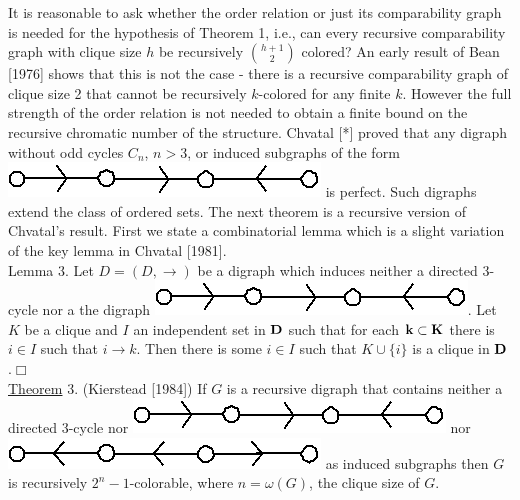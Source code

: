 \documentclass[twoside]{article}
\begin{document}
It is reasonable to ask whether the order relation or just its comparability graph is needed for the hypothesis of
Theorem 1, i.e., can every recursive comparability graph with clique size $h$ be recursively $\binom{h+1}{2}$ colored?   An early result of Bean [1976] shows that
this is not the case - there is a recursive comparability graph of clique size
2	that cannot be recursively   $k$-colored for any finite $k$.    However the full strength of the order relation is not needed to obtain a finite bound on the recursive chromatic number of the structure.    
Chvatal [*] proved that any digraph without odd cycles  $C_n$,  $n>3$, or induced subgraphs of the form \includegraphics[scale=0.25]{figures/small/1.png} is perfect.   
Such digraphs extend the class of ordered sets. 
The next theorem is a recursive version of Chvatal's result.   
First we state a combinatorial lemma which is a slight variation of the key lemma in Chvatal [1981].\\
\newline
Lemma 3.    Let   $D = (D, \rightarrow)$ be a digraph which induces neither a directed 3-cycle nor a the digraph \includegraphics[scale=0.25]{figures/small/1.png}.    
Let   $K$   be a clique and $I$ an independent set in   $\mathbf{D}$   such that for each   $\mathbf{k\subset K}$   there is  $i\in I$   such that $i\rightarrow k$. 
Then there is some $i\in I$   such that   $K\cup \{i\}$ is a clique in $\mathbf{D}$.$\Box$\\
\newline
\underline{Theorem} 3. (Kierstead [1984]) If   $G$   is a recursive digraph that contains neither a directed 3-cycle nor \includegraphics[scale=0.25]{figures/small/1.png} nor \includegraphics[scale=0.25]{figures/small/2.png} as induced
\newpage
%
%
subgraphs then $G$ is recursively $2^n-1$-colorable, where $n = \omega(G)$, the clique size of $G$.\\
\newline
\end{document}
